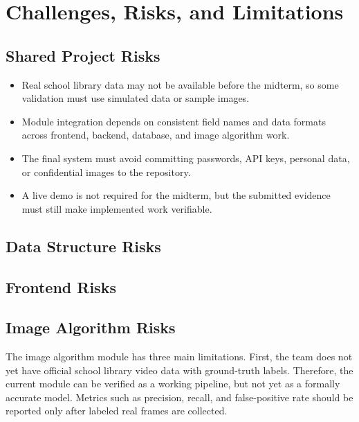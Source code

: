 \section{Challenges, Risks, and Limitations}

\subsection{Shared Project Risks}

\begin{itemize}
  \item Real school library data may not be available before the midterm, so some validation must use simulated data or sample images.
  \item Module integration depends on consistent field names and data formats across frontend, backend, database, and image algorithm work.
  \item The final system must avoid committing passwords, API keys, personal data, or confidential images to the repository.
  \item A live demo is not required for the midterm, but the submitted evidence must still make implemented work verifiable.
\end{itemize}

\subsection{Data Structure Risks}


\subsection{Frontend Risks}


\subsection{Image Algorithm Risks}

The image algorithm module has three main limitations. First, the team does not yet have official school library video data with ground-truth labels. Therefore, the current module can be verified as a working pipeline, but not yet as a formally accurate model. Metrics such as precision, recall, and false-positive rate should be reported only after labeled real frames are collected.

